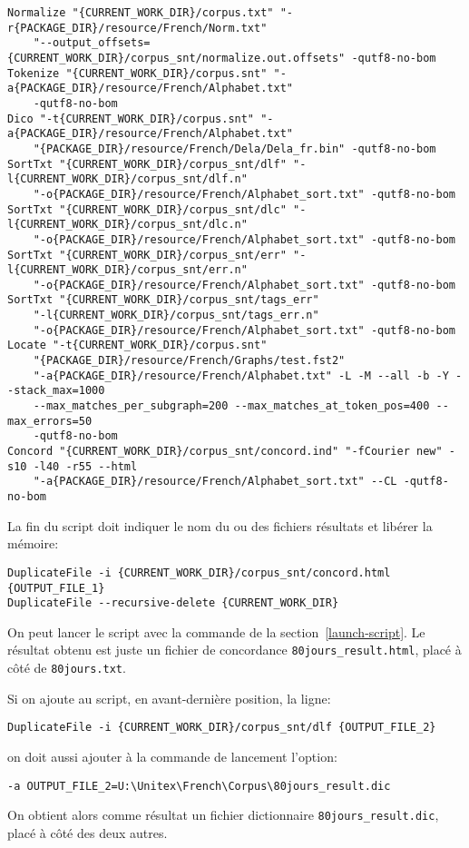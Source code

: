 \begin{Verbatim}[fontsize=\small,fontfamily=helvetica]
Normalize "{CURRENT_WORK_DIR}/corpus.txt" "-r{PACKAGE_DIR}/resource/French/Norm.txt" 
    "--output_offsets={CURRENT_WORK_DIR}/corpus_snt/normalize.out.offsets" -qutf8-no-bom
Tokenize "{CURRENT_WORK_DIR}/corpus.snt" "-a{PACKAGE_DIR}/resource/French/Alphabet.txt"
    -qutf8-no-bom
Dico "-t{CURRENT_WORK_DIR}/corpus.snt" "-a{PACKAGE_DIR}/resource/French/Alphabet.txt" 
    "{PACKAGE_DIR}/resource/French/Dela/Dela_fr.bin" -qutf8-no-bom
SortTxt "{CURRENT_WORK_DIR}/corpus_snt/dlf" "-l{CURRENT_WORK_DIR}/corpus_snt/dlf.n" 
    "-o{PACKAGE_DIR}/resource/French/Alphabet_sort.txt" -qutf8-no-bom
SortTxt "{CURRENT_WORK_DIR}/corpus_snt/dlc" "-l{CURRENT_WORK_DIR}/corpus_snt/dlc.n" 
    "-o{PACKAGE_DIR}/resource/French/Alphabet_sort.txt" -qutf8-no-bom
SortTxt "{CURRENT_WORK_DIR}/corpus_snt/err" "-l{CURRENT_WORK_DIR}/corpus_snt/err.n" 
    "-o{PACKAGE_DIR}/resource/French/Alphabet_sort.txt" -qutf8-no-bom
SortTxt "{CURRENT_WORK_DIR}/corpus_snt/tags_err"
    "-l{CURRENT_WORK_DIR}/corpus_snt/tags_err.n" 
    "-o{PACKAGE_DIR}/resource/French/Alphabet_sort.txt" -qutf8-no-bom
Locate "-t{CURRENT_WORK_DIR}/corpus.snt"
    "{PACKAGE_DIR}/resource/French/Graphs/test.fst2" 
    "-a{PACKAGE_DIR}/resource/French/Alphabet.txt" -L -M --all -b -Y --stack_max=1000
    --max_matches_per_subgraph=200 --max_matches_at_token_pos=400 --max_errors=50
    -qutf8-no-bom
Concord "{CURRENT_WORK_DIR}/corpus_snt/concord.ind" "-fCourier new" -s10 -l40 -r55 --html 
    "-a{PACKAGE_DIR}/resource/French/Alphabet_sort.txt" --CL -qutf8-no-bom
\end{Verbatim}

\noindent La fin du script doit indiquer le nom du ou des fichiers résultats et libérer la mémoire:

\begin{Verbatim}[fontsize=\small,fontfamily=helvetica]
DuplicateFile -i {CURRENT_WORK_DIR}/corpus_snt/concord.html {OUTPUT_FILE_1}
DuplicateFile --recursive-delete {CURRENT_WORK_DIR}
\end{Verbatim}

\noindent On peut lancer le script avec la commande de la section~\ref{launch-script}. Le résultat
obtenu est juste un fichier de concordance \verb$80jours_result.html$, placé à côté de
\verb$80jours.txt$.

\bigskip
\noindent Si on ajoute au script, en avant-dernière position, la ligne:

\begin{Verbatim}[fontsize=\small,fontfamily=helvetica]
DuplicateFile -i {CURRENT_WORK_DIR}/corpus_snt/dlf {OUTPUT_FILE_2}
\end{Verbatim}

\noindent on doit aussi ajouter à la commande de lancement l'option:

\begin{Verbatim}[fontsize=\small,fontfamily=helvetica]
-a OUTPUT_FILE_2=U:\Unitex\French\Corpus\80jours_result.dic
\end{Verbatim}

\noindent On obtient alors comme résultat un fichier dictionnaire \verb$80jours_result.dic$, placé à côté
des deux autres.
